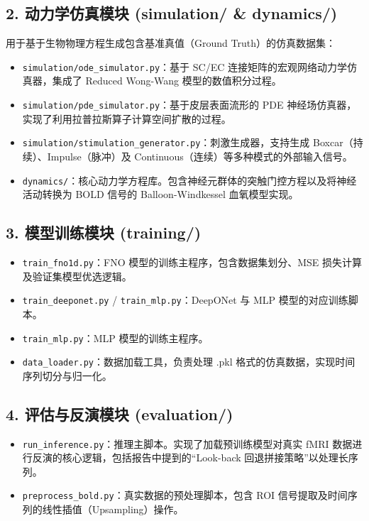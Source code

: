 \documentclass[12pt,a4paper]{article}
\begin{document}
\subsection*{2. 动力学仿真模块 (simulation/ \& dynamics/)}
用于基于生物物理方程生成包含基准真值（Ground Truth）的仿真数据集：
\begin{itemize}
    \item \texttt{simulation/ode\_simulator.py}：基于 SC/EC 连接矩阵的宏观网络动力学仿真器，集成了 Reduced Wong-Wang 模型的数值积分过程。
    \item \texttt{simulation/pde\_simulator.py}：基于皮层表面流形的 PDE 神经场仿真器，实现了利用拉普拉斯算子计算空间扩散的过程。
    \item \texttt{simulation/stimulation\_generator.py}：刺激生成器，支持生成 Boxcar（持续）、Impulse（脉冲）及 Continuous（连续）等多种模式的外部输入信号。
    \item \texttt{dynamics/}：核心动力学方程库。包含神经元群体的突触门控方程以及将神经活动转换为 BOLD 信号的 Balloon-Windkessel 血氧模型实现。
\end{itemize}

\subsection*{3. 模型训练模块 (training/)}
\begin{itemize}
    \item \texttt{train\_fno1d.py}：FNO 模型的训练主程序，包含数据集划分、MSE 损失计算及验证集模型优选逻辑。
    \item \texttt{train\_deeponet.py} / \texttt{train\_mlp.py}：DeepONet 与 MLP 模型的对应训练脚本。
    \item \texttt{train\_mlp.py}：MLP 模型的训练主程序。
    \item \texttt{data\_loader.py}：数据加载工具，负责处理 .pkl 格式的仿真数据，实现时间序列切分与归一化。
\end{itemize}

\subsection*{4. 评估与反演模块 (evaluation/)}
\begin{itemize}
    \item \texttt{run\_inference.py}：推理主脚本。实现了加载预训练模型对真实 fMRI 数据进行反演的核心逻辑，包括报告中提到的“Look-back 回退拼接策略”以处理长序列。
    \item \texttt{preprocess\_bold.py}：真实数据的预处理脚本，包含 ROI 信号提取及时间序列的线性插值（Upsampling）操作。
\end{itemize}
\end{document}
